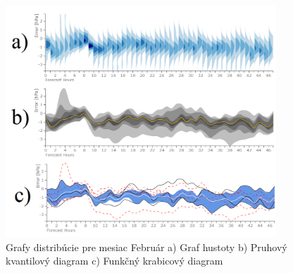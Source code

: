 \begin{figure}
	\centering
	\includegraphics[width = 4in]{distrib}
	\caption{Grafy distribúcie pre mesiac Február a) Graf hustoty b) Pruhový kvantilový diagram c) Funkčný krabicový diagram}
	\label{fig:distrib} 
\end{figure}

  

